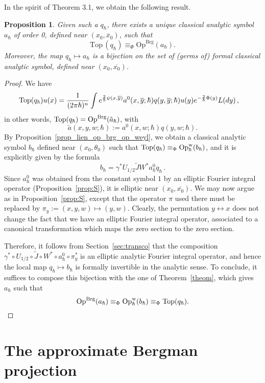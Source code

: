 \documentclass{article}
\newtheorem{prop}[theo]{Proposition}
\newcommand{\Op}{\mathrm{Op}}
\newcommand{\Brg}{\mathrm{Brg}}
\newcommand{\Top}{\mathop{\textup{Top}}}
\newcommand{\w}{\mathrm{w}}
\newcommand{\Opbrg}{\Op^{\Brg}}
\newcommand{\h}{\hbar}
\newcommand{\hnegl}{\equiv_\Phi}
\begin{document}
In the spirit of Theorem 3.1, we obtain the following result.
\begin{prop} Given such a $q_\h$, there exists a unique classical
  analytic symbol $a_\hbar$ of order 0, defined near
  $(x_0,\overline{x}_0)$, such that
  \[
    \mathrm{Top\,}(q_\h)\hnegl \Opbrg(a_\hbar ).
  \]
  Moreover, the map $q_\h\mapsto a_\h$ is a bijection on the set of
  (germs of) formal classical analytic symbol, defined near
  $(x_0,\overline{x_0})$.
\end{prop}


\begin{proof}
  We have
\[\begin{split}
    \Top(q_\h)u(x)&=\frac{1}{(2\pi \hbar )^n}\int e^{\frac{2}{\hbar
      }\psi (x,\overline{y})}a^0(x,\overline{y};\hbar
    )q(y,\overline{y};\hbar )u(y)e^{-\frac{2}{\hbar }\Phi (y)}L(dy)\,,
\end{split}\]
in other words, $\Top(q_\h) = \Opbrg(\tilde a_\h)$, with
\[
\tilde a (x,y,w;\h) := a^0(x,w;\h) q(y,w;\h).
\]
By Proposition~\ref{prop_lien_op_brg_op_weyl}, we obtain a classical
analytic symbol $b_\h$ defined near $(x_0,\theta_0)$ such that
$\Top(q_\h) \hnegl \Op^{\w}_\h(b_{ \hbar})$, and it is explicitly
given by the formula
\[
b_{ \hbar} = \gamma^* U_{1/2} \tilde{J} W^*
  a^0_{ \hbar} q_\h\,.
\]
Since $a^0_\h$ was obtained from the constant symbol $1$ by an
elliptic Fourier integral operator (Proposition~\ref{prop:S}), it is
elliptic near $(x_0,\overline{x_0})$. We may now argue as in
Proposition~\ref{prop:S}, except that the operator $\pi$ used there
must be replaced by $\pi_y := (x,y,w) \mapsto (y,w)$. Clearly, the
permutation $y\leftrightarrow x$ does not change the fact that we have
an elliptic Fourier integral operator, associated to a canonical
transformation which maps the zero section to the zero section.

Therefore, it follows from Section~\ref{sec:transco} that the
composition
$\gamma^* \circ U_{1/2} \circ \tilde{J} \circ W^* \circ a^0_{ \hbar}
\circ \pi_y^*$ is an elliptic analytic Fourier integral operator, and
hence the local map $ q_\h \mapsto b_\h$ is formally invertible in the
analytic sense. To conclude, it suffices to compose this bijection
with the one of Theorem~\ref{theom}, which gives $a_\h$ such that
\[
\Opbrg(a_\h) \hnegl \Op^{\w}_\h(b_{ \hbar}) \hnegl \Top(q_\h).
\]
\end{proof}


\section{The approximate Bergman projection}
\label{sec:appr-bergm-proj}
\end{document}
